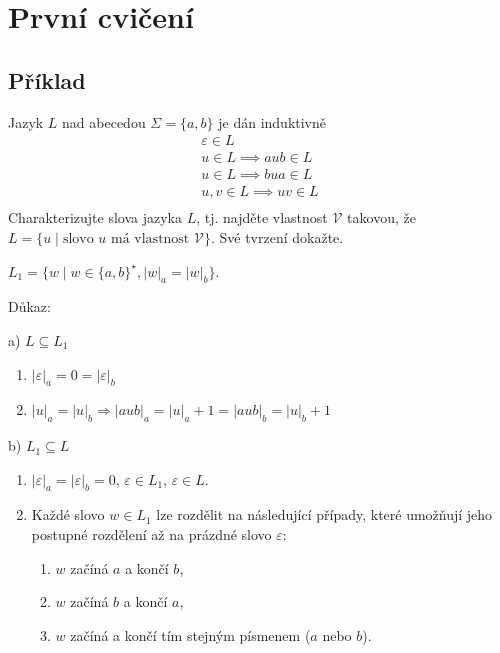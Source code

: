 \section{První cvičení}

\subsection{Příklad}
Jazyk $L$ nad abecedou $\Sigma = \{a,b\}$ je dán induktivně
\begin{gather*}
    \varepsilon \in L \\
    u \in L \implies aub \in L\\
    u \in L \implies bua \in L\\
    u, v \in L \implies uv \in L\\
\end{gather*}
Charakterizujte slova jazyka $L$, tj. najděte vlastnost $\mathcal{V}$ takovou, že $L = \{u \mid \text{slovo } u
\text{ má vlastnost } \mathcal{V}\}$. Své tvrzení dokažte.

$L_1 = \{w \mid w \in \{a,b\}^\star, |w|_a=|w|_b\}$.

Důkaz:

a) $L \subseteq L_1$

\begin{enumerate}
    \item $|\varepsilon|_a = 0 = |\varepsilon|_b$
    \item $|u|_a = |u|_b \Rightarrow |aub|_a = |u|_a + 1 = |aub|_b = |u|_b + 1$
\end{enumerate}

b) $L_1 \subseteq L$

\begin{enumerate}
    \item $|\varepsilon|_a = |\varepsilon|_b = 0$, $\varepsilon \in L_1$, $\varepsilon \in L$.
    \item Každé slovo $w \in L_1$ lze rozdělit na následující případy, které umožňují jeho postupné rozdělení až na
    prázdné slovo $\varepsilon$:
    \begin{enumerate}[label={}, noitemsep]
        \item {} $w$ začíná $a$ a končí $b$,
        \item {} $w$ začíná $b$ a končí $a$,
        \item {} $w$ začíná a končí tím stejným písmenem ($a$ nebo $b$).
    \end{enumerate}
\end{enumerate}

